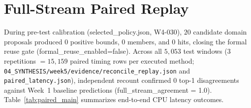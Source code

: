 \documentclass[11pt,oneside,a4paper]{report}
\newcommand{\code}[1]{{\small\upshape\ttfamily #1}}
\theoremstyle{remark}
\begin{document}
\section{Full-Stream Paired Replay}
During pre-test calibration (\code{selected\_policy.json}, \code{W4-030}), $20$ candidate domain proposals produced $0$ positive bounds, $0$ members, and $0$ hits, closing the formal reuse gate (\code{formal\_reuse\_enabled=false}). Across all $5{,}053$ test windows ($3$ repetitions $= 15{,}159$ paired timing rows per executed method; \nolinkurl{04_SYNTHESIS/week5/evidence/reconcile_replay.json} and \nolinkurl{paired_latency.json}), independent recount confirmed $0$ top-1 disagreements against Week~1 baseline predictions (\code{full\_stream\_agreement = 1.0}). Table~\ref{tab:paired_main} summarizes end-to-end CPU latency outcomes.
\end{document}

